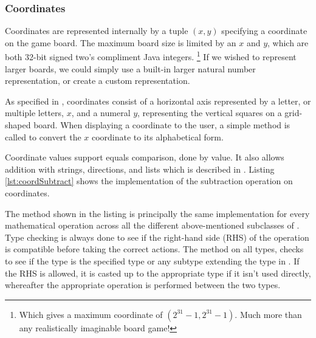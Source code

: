 \subsubsection{Coordinates}
Coordinates are represented internally by a tuple $(x, y)$ specifying a
coordinate on the game board. The maximum board size is limited by an $x$ and
$y$, which are both 32-bit signed two's compliment Java integers.
\footnote{ Which gives a maximum coordinate of $(2^{31} - 1, 2^{31} - 1)$.
Much more than any realistically imaginable board game!}
If we wished to represent larger boards, we could simply use a built-in larger
natural number representation, or create a custom representation.

As specified in , coordinates consist of
a horizontal axis represented by a letter, or multiple letters, $x$, and a
numeral $y$, representing the vertical squares on a grid-shaped board.
When displaying a coordinate to the user, a simple method is called to
convert the $x$ coordinate to its alphabetical form.

Coordinate values support equals comparison, done by value. It also allows
addition with strings, directions, and lists which is described in
. Listing \ref{lst:coordSubtract} shows the
implementation of the subtraction operation on coordinates.



The method shown in the listing is principally the same implementation for every
mathematical operation across all the different above-mentioned subclasses of
. Type checking is always done to see if the right-hand side
(RHS) of
the operation is compatible before taking the correct actions. The method
 on all  types, checks to see if the type is the
specified type or any subtype extending the type in \productname{}. If the RHS
is allowed, it is casted up to the appropriate type if it isn't used directly,
whereafter the appropriate operation is performed between the two types.

%


